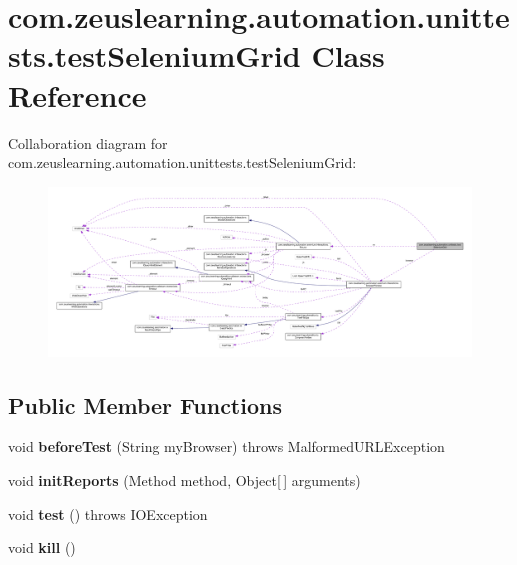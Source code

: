 \hypertarget{classcom_1_1zeuslearning_1_1automation_1_1unittests_1_1testSeleniumGrid}{}\section{com.\+zeuslearning.\+automation.\+unittests.\+test\+Selenium\+Grid Class Reference}
\label{classcom_1_1zeuslearning_1_1automation_1_1unittests_1_1testSeleniumGrid}


Collaboration diagram for com.\+zeuslearning.\+automation.\+unittests.\+test\+Selenium\+Grid\+:
\nopagebreak
\begin{figure}[H]
\begin{center}
\leavevmode
\includegraphics[width=350pt]{d5/de9/classcom_1_1zeuslearning_1_1automation_1_1unittests_1_1testSeleniumGrid__coll__graph}
\end{center}
\end{figure}
\subsection*{Public Member Functions}
\begin{DoxyCompactItemize}
\item 
\hypertarget{classcom_1_1zeuslearning_1_1automation_1_1unittests_1_1testSeleniumGrid_a83fedb42a91d173708327fd3a73df82a}{}\label{classcom_1_1zeuslearning_1_1automation_1_1unittests_1_1testSeleniumGrid_a83fedb42a91d173708327fd3a73df82a} 
void {\bfseries before\+Test} (String my\+Browser)  throws Malformed\+U\+R\+L\+Exception 
\item 
\hypertarget{classcom_1_1zeuslearning_1_1automation_1_1unittests_1_1testSeleniumGrid_a61acd721af5216d1e6d6ce7cba754a0c}{}\label{classcom_1_1zeuslearning_1_1automation_1_1unittests_1_1testSeleniumGrid_a61acd721af5216d1e6d6ce7cba754a0c} 
void {\bfseries init\+Reports} (Method method, Object\mbox{[}$\,$\mbox{]} arguments)
\item 
\hypertarget{classcom_1_1zeuslearning_1_1automation_1_1unittests_1_1testSeleniumGrid_a9f28ba120ebfd6477fc73dda8538ed49}{}\label{classcom_1_1zeuslearning_1_1automation_1_1unittests_1_1testSeleniumGrid_a9f28ba120ebfd6477fc73dda8538ed49} 
void {\bfseries test} ()  throws I\+O\+Exception 
\item 
\hypertarget{classcom_1_1zeuslearning_1_1automation_1_1unittests_1_1testSeleniumGrid_a79c5bd52c363c15b3d7ea89fa63bcad1}{}\label{classcom_1_1zeuslearning_1_1automation_1_1unittests_1_1testSeleniumGrid_a79c5bd52c363c15b3d7ea89fa63bcad1} 
void {\bfseries kill} ()
\end{DoxyCompactItemize}
